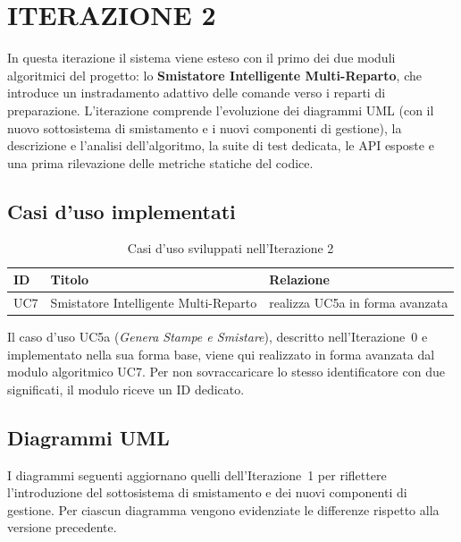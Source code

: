 \section{ITERAZIONE 2}

In questa iterazione il sistema viene esteso con il primo dei due moduli
algoritmici del progetto: lo \textbf{Smistatore Intelligente Multi-Reparto}, che
introduce un instradamento adattivo delle comande verso i reparti di
preparazione. L'iterazione comprende l'evoluzione dei diagrammi UML (con il nuovo
sottosistema di smistamento e i nuovi componenti di gestione), la descrizione e
l'analisi dell'algoritmo, la suite di test dedicata, le API esposte e una prima
rilevazione delle metriche statiche del codice.

\subsection{Casi d'uso implementati}

\begin{table}[H]
\centering
\caption{Casi d'uso sviluppati nell'Iterazione 2}
\label{tab:uc-iter2}
\begin{tabular}{lll}
\toprule
\textbf{ID} & \textbf{Titolo} & \textbf{Relazione} \\
\midrule
UC7 & Smistatore Intelligente Multi-Reparto & realizza UC5a in forma avanzata \\
\bottomrule
\end{tabular}
\end{table}

Il caso d'uso UC5a (\textit{Genera Stampe e Smistare}), descritto nell'Iterazione~0
e implementato nella sua forma base, viene qui realizzato in forma avanzata dal
modulo algoritmico UC7. Per non sovraccaricare lo stesso identificatore con due
significati, il modulo riceve un ID dedicato.

\subsection{Diagrammi UML}

I diagrammi seguenti aggiornano quelli dell'Iterazione~1 per riflettere
l'introduzione del sottosistema di smistamento e dei nuovi componenti di
gestione. Per ciascun diagramma vengono evidenziate le differenze rispetto alla
versione precedente.

